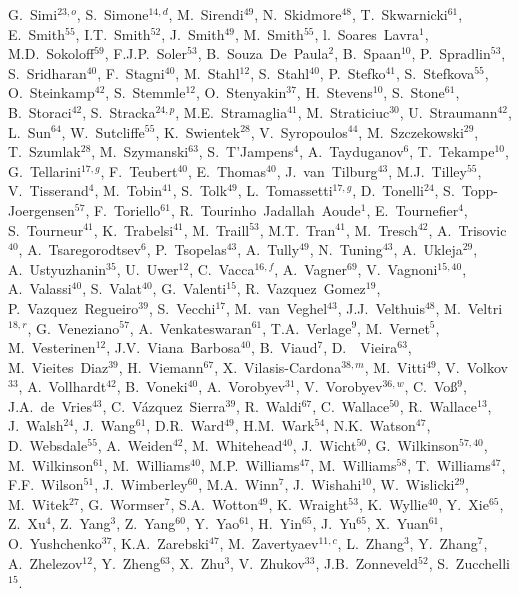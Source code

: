 \documentclass[12pt,a4paper]{article}
\begin{document}
\begin{flushleft}
G.~Simi$^{23,o}$,
S.~Simone$^{14,d}$,
M.~Sirendi$^{49}$,
N.~Skidmore$^{48}$,
T.~Skwarnicki$^{61}$,
E.~Smith$^{55}$,
I.T.~Smith$^{52}$,
J.~Smith$^{49}$,
M.~Smith$^{55}$,
l.~Soares~Lavra$^{1}$,
M.D.~Sokoloff$^{59}$,
F.J.P.~Soler$^{53}$,
B.~Souza~De~Paula$^{2}$,
B.~Spaan$^{10}$,
P.~Spradlin$^{53}$,
S.~Sridharan$^{40}$,
F.~Stagni$^{40}$,
M.~Stahl$^{12}$,
S.~Stahl$^{40}$,
P.~Stefko$^{41}$,
S.~Stefkova$^{55}$,
O.~Steinkamp$^{42}$,
S.~Stemmle$^{12}$,
O.~Stenyakin$^{37}$,
H.~Stevens$^{10}$,
S.~Stone$^{61}$,
B.~Storaci$^{42}$,
S.~Stracka$^{24,p}$,
M.E.~Stramaglia$^{41}$,
M.~Straticiuc$^{30}$,
U.~Straumann$^{42}$,
L.~Sun$^{64}$,
W.~Sutcliffe$^{55}$,
K.~Swientek$^{28}$,
V.~Syropoulos$^{44}$,
M.~Szczekowski$^{29}$,
T.~Szumlak$^{28}$,
M.~Szymanski$^{63}$,
S.~T'Jampens$^{4}$,
A.~Tayduganov$^{6}$,
T.~Tekampe$^{10}$,
G.~Tellarini$^{17,g}$,
F.~Teubert$^{40}$,
E.~Thomas$^{40}$,
J.~van~Tilburg$^{43}$,
M.J.~Tilley$^{55}$,
V.~Tisserand$^{4}$,
M.~Tobin$^{41}$,
S.~Tolk$^{49}$,
L.~Tomassetti$^{17,g}$,
D.~Tonelli$^{24}$,
S.~Topp-Joergensen$^{57}$,
F.~Toriello$^{61}$,
R.~Tourinho~Jadallah~Aoude$^{1}$,
E.~Tournefier$^{4}$,
S.~Tourneur$^{41}$,
K.~Trabelsi$^{41}$,
M.~Traill$^{53}$,
M.T.~Tran$^{41}$,
M.~Tresch$^{42}$,
A.~Trisovic$^{40}$,
A.~Tsaregorodtsev$^{6}$,
P.~Tsopelas$^{43}$,
A.~Tully$^{49}$,
N.~Tuning$^{43}$,
A.~Ukleja$^{29}$,
A.~Ustyuzhanin$^{35}$,
U.~Uwer$^{12}$,
C.~Vacca$^{16,f}$,
A.~Vagner$^{69}$,
V.~Vagnoni$^{15,40}$,
A.~Valassi$^{40}$,
S.~Valat$^{40}$,
G.~Valenti$^{15}$,
R.~Vazquez~Gomez$^{19}$,
P.~Vazquez~Regueiro$^{39}$,
S.~Vecchi$^{17}$,
M.~van~Veghel$^{43}$,
J.J.~Velthuis$^{48}$,
M.~Veltri$^{18,r}$,
G.~Veneziano$^{57}$,
A.~Venkateswaran$^{61}$,
T.A.~Verlage$^{9}$,
M.~Vernet$^{5}$,
M.~Vesterinen$^{12}$,
J.V.~Viana~Barbosa$^{40}$,
B.~Viaud$^{7}$,
D.~~Vieira$^{63}$,
M.~Vieites~Diaz$^{39}$,
H.~Viemann$^{67}$,
X.~Vilasis-Cardona$^{38,m}$,
M.~Vitti$^{49}$,
V.~Volkov$^{33}$,
A.~Vollhardt$^{42}$,
B.~Voneki$^{40}$,
A.~Vorobyev$^{31}$,
V.~Vorobyev$^{36,w}$,
C.~Vo{\ss}$^{9}$,
J.A.~de~Vries$^{43}$,
C.~V{\'a}zquez~Sierra$^{39}$,
R.~Waldi$^{67}$,
C.~Wallace$^{50}$,
R.~Wallace$^{13}$,
J.~Walsh$^{24}$,
J.~Wang$^{61}$,
D.R.~Ward$^{49}$,
H.M.~Wark$^{54}$,
N.K.~Watson$^{47}$,
D.~Websdale$^{55}$,
A.~Weiden$^{42}$,
M.~Whitehead$^{40}$,
J.~Wicht$^{50}$,
G.~Wilkinson$^{57,40}$,
M.~Wilkinson$^{61}$,
M.~Williams$^{40}$,
M.P.~Williams$^{47}$,
M.~Williams$^{58}$,
T.~Williams$^{47}$,
F.F.~Wilson$^{51}$,
J.~Wimberley$^{60}$,
M.A.~Winn$^{7}$,
J.~Wishahi$^{10}$,
W.~Wislicki$^{29}$,
M.~Witek$^{27}$,
G.~Wormser$^{7}$,
S.A.~Wotton$^{49}$,
K.~Wraight$^{53}$,
K.~Wyllie$^{40}$,
Y.~Xie$^{65}$,
Z.~Xu$^{4}$,
Z.~Yang$^{3}$,
Z.~Yang$^{60}$,
Y.~Yao$^{61}$,
H.~Yin$^{65}$,
J.~Yu$^{65}$,
X.~Yuan$^{61}$,
O.~Yushchenko$^{37}$,
K.A.~Zarebski$^{47}$,
M.~Zavertyaev$^{11,c}$,
L.~Zhang$^{3}$,
Y.~Zhang$^{7}$,
A.~Zhelezov$^{12}$,
Y.~Zheng$^{63}$,
X.~Zhu$^{3}$,
V.~Zhukov$^{33}$,
J.B.~Zonneveld$^{52}$,
S.~Zucchelli$^{15}$.\bigskip


\end{flushleft}
\end{document}
